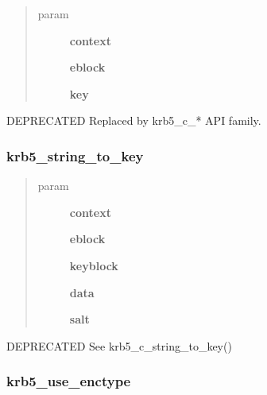 \documentclass[letterpaper,10pt,english]{sphinxmanual}
\begin{document}
\begin{quote}\begin{description}
\item[{param}] \leavevmode
\textbf{context}

\textbf{eblock}

\textbf{key}

\end{description}\end{quote}

DEPRECATED Replaced by krb5\_c\_* API family.


\subsubsection{krb5\_string\_to\_key}
\label{appdev/refs/api/krb5_string_to_key:krb5-string-to-key}\label{appdev/refs/api/krb5_string_to_key::doc}

\begin{fulllineitems}
\label{appdev/refs/api/krb5_string_to_key:c.krb5_string_to_key}
\end{fulllineitems}

\begin{quote}\begin{description}
\item[{param}] \leavevmode
\textbf{context}

\textbf{eblock}

\textbf{keyblock}

\textbf{data}

\textbf{salt}

\end{description}\end{quote}

DEPRECATED See krb5\_c\_string\_to\_key()


\subsubsection{krb5\_use\_enctype}
\label{appdev/refs/api/krb5_use_enctype:krb5-use-enctype}\label{appdev/refs/api/krb5_use_enctype::doc}
\end{document}
